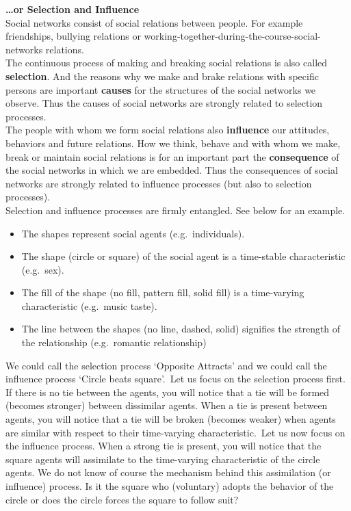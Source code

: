 \documentclass[
]{book}
\providecommand{\tightlist}{%
  \setlength{\itemsep}{0pt}\setlength{\parskip}{0pt}}
\begin{document}
\textbf{\ldots or Selection and Influence}\\
Social networks consist of social relations between people. For example friendships, bullying relations or working-together-during-the-course-social-networks relations.\\
The continuous process of making and breaking social relations is also called \textbf{selection}. And the reasons why we make and brake relations with specific persons are important \textbf{causes} for the structures of the social networks we observe. Thus the causes of social networks are strongly related to selection processes.\\
The people with whom we form social relations also \textbf{influence} our attitudes, behaviors and future relations. How we think, behave and with whom we make, break or maintain social relations is for an important part the \textbf{consequence} of the social networks in which we are embedded. Thus the consequences of social networks are strongly related to influence processes (but also to selection processes).\\
Selection and influence processes are firmly entangled. See below for an example.

\begin{itemize}
\tightlist
\item
  The shapes represent social agents (e.g.~individuals).\\
\item
  The shape (circle or square) of the social agent is a time-stable characteristic (e.g.~sex).\\
\item
  The fill of the shape (no fill, pattern fill, solid fill) is a time-varying characteristic (e.g.~music taste).
\item
  The line between the shapes (no line, dashed, solid) signifies the strength of the relationship (e.g.~romantic relationship)
\end{itemize}

We could call the selection process `Opposite Attracts' and we could call the influence process `Circle beats square'.~Let us focus on the selection process first. If there is no tie between the agents, you will notice that a tie will be formed (becomes stronger) between dissimilar agents. When a tie is present between agents, you will notice that a tie will be broken (becomes weaker) when agents are similar with respect to their time-varying characteristic.~Let us now focus on the influence process. When a strong tie is present, you will notice that the square agents will assimilate to the time-varying characteristic of the circle agents. We do not know of course the mechanism behind this assimilation (or influence) process. Is it the square who (voluntary) adopts the behavior of the circle or does the circle forces the square to follow suit?
\end{document}
